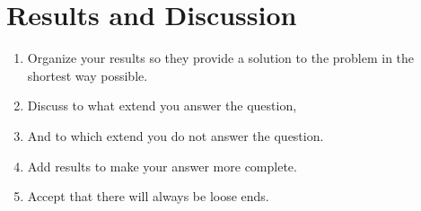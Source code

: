 \section{Results and Discussion}

\begin{enumerate}
    \item Organize your results so they provide a solution to the problem in the shortest way
          possible.
    \item Discuss to what extend you answer the question,
    \item And to which extend you do not answer the question.
    \item Add results to make your answer more complete.
    \item Accept that there will always be loose ends.
\end{enumerate}